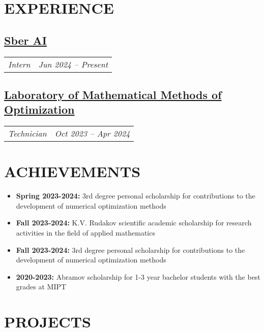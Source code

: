 \documentclass[11pt,a4paper]{moderncv}
\newcommand*{\experienceentry}[4][1.5mm]{
    \subsection{#2} \vspace{-1.5mm}
    \begin{tabularx}{\textwidth}{LR}
        {\itshape #3} & {\itshape #4}
    \end{tabularx}
    \par\addvspace{#1}
}
\begin{document}
\maketitle
\vspace{-0.5cm}

\begin{minipage}[t]{0.62\textwidth}

\section{EXPERIENCE}
\experienceentry{\href{https://ai.sber.ru/en/about}{Sber AI}}{Intern}{Jun 2024 -- Present}
\experienceentry{\href{https://labmmo.ru/en}{Laboratory of Mathematical Methods of Optimization}}{Technician}{Oct 2023 -- Apr 2024}

\section{ACHIEVEMENTS}

\begin{itemize}
\item \textbf{Spring 2023-2024:} 3rd degree personal scholarship for contributions to the development of numerical optimization methods
\item \textbf{Fall 2023-2024:} K.V. Rudakov scientific academic scholarship for research activities in the field of applied mathematics
\item \textbf{Fall 2023-2024:} 3rd degree personal scholarship for contributions to the development of numerical optimization methods
\item \textbf{2020-2023:} Abramov scholarship for 1-3 year bachelor students with the best grades at MIPT
\end{itemize}

\section{PROJECTS}


\end{minipage}
\end{document}
